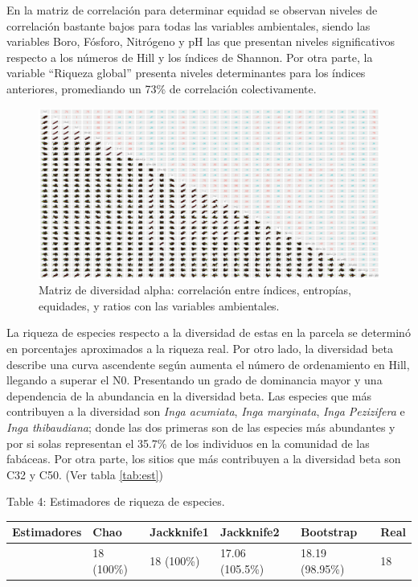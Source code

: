 \documentclass[11pt,]{article}
\begin{document}
En la matriz de correlación para determinar equidad se observan niveles
de correlación bastante bajos para todas las variables ambientales,
siendo las variables Boro, Fósforo, Nitrógeno y pH las que presentan
niveles significativos respecto a los números de Hill y los índices de
Shannon. Por otra parte, la variable ``Riqueza global'' presenta niveles
determinantes para los índices anteriores, promediando un 73\% de
correlación colectivamente.

\begin{figure}
\centering
\includegraphics[width=1.00000\textwidth]{Analisis/Diversidad/Indices_Env_Diversidad_Alpha_2.png}
\caption{Matriz de diversidad alpha: correlación entre índices,
entropías, equidades, y ratios con las variables
ambientales.\label{fig:divA}}
\end{figure}

La riqueza de especies respecto a la diversidad de estas en la parcela
se determinó en porcentajes aproximados a la riqueza real. Por otro
lado, la diversidad beta describe una curva ascendente según aumenta el
número de ordenamiento en Hill, llegando a superar el N0. Presentando un
grado de dominancia mayor y una dependencia de la abundancia en la
diversidad beta. Las especies que más contribuyen a la diversidad son
\emph{Inga acumiata}, \emph{Inga marginata}, \emph{Inga Pezizifera} e
\emph{Inga thibaudiana}; donde las dos primeras son de las especies más
abundantes y por si solas representan el 35.7\% de los individuos en la
comunidad de las fabáceas. Por otra parte, los sitios que más
contribuyen a la diversidad beta son C32 y C50. (Ver tabla
\ref{tab:est})

Table 4: Estimadores de riqueza de especies. \label{tab:est}

\begin{longtable}[]{@{}llllll@{}}
\toprule
Estimadores & Chao & Jackknife1 & Jackknife2 & Bootstrap &
Real\tabularnewline
\midrule
\endhead
& 18 (100\%) & 18 (100\%) & 17.06 (105.5\%) & 18.19 (98.95\%) &
18\tabularnewline
\bottomrule
\end{longtable}
\end{document}
